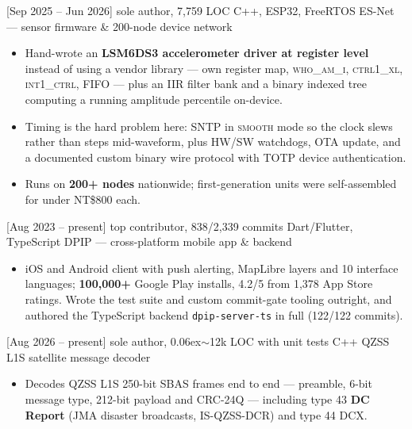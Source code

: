 \documentclass{resume}
\begin{document}
\begin{projects}
  \project%
    {}[Sep 2025 -- Jun 2026]%
    {sole author, 7,759 LOC}%
    {C++, ESP32, FreeRTOS}%
    {ES-Net --- sensor firmware \& 200-node device network}%
    {\begin{itemize}
      \item Hand-wrote an \textbf{LSM6DS3 accelerometer driver at register level} instead of using a
        vendor library --- own register map, \textsc{who\_am\_i}, \textsc{ctrl1\_xl},
        \textsc{int1\_ctrl}, FIFO --- plus an IIR filter bank and a binary indexed tree computing a
        running amplitude percentile on-device.
      \item Timing is the hard problem here: SNTP in \textsc{smooth} mode so the clock slews rather
        than steps mid-waveform, plus HW/SW watchdogs, OTA update, and a documented custom binary
        wire protocol with TOTP device authentication.
      \item Runs on \textbf{200+ nodes} nationwide; first-generation units were self-assembled for
        under NT\$800 each.
    \end{itemize}}

  \separator{0.7em}

  \project%
    {}[Aug 2023 -- present]%
    {top contributor, 838/2,339 commits}%
    {Dart/Flutter, TypeScript}%
    {DPIP --- cross-platform mobile app \& backend}%
    {\begin{itemize}
      \item iOS and Android client with push alerting, MapLibre layers and 10 interface languages;
        \textbf{100,000+} Google Play installs, 4.2/5 from 1,378 App Store ratings. Wrote the test
        suite and custom commit-gate tooling outright, and authored the TypeScript backend
        \texttt{dpip-server-ts} in full (122/122 commits).
    \end{itemize}}

  \separator{0.7em}

  \project%
    {}[Aug 2026 -- present]%
    {sole author, {\raise0.06ex\hbox{$\sim$}}12k LOC with unit tests}%
    {C++}%
    {QZSS L1S satellite message decoder}%
    {\begin{itemize}
      \item Decodes QZSS L1S 250-bit SBAS frames end to end --- preamble, 6-bit message type,
        212-bit payload and CRC-24Q --- including type 43 \textbf{DC Report} (JMA disaster
        broadcasts, IS-QZSS-DCR) and type 44 DCX.
    \end{itemize}}

  \separator{0.7em}


\end{projects}
\end{document}
